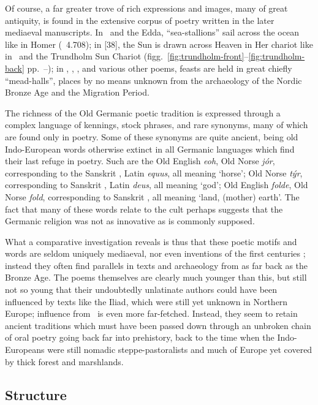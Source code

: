   Of course, a far greater trove of rich expressions and images, many of great antiquity, is found in the extensive corpus of poetry written in the later mediaeval manuscripts.  In \Beowulf\ and the Edda, “sea-stallions” sail across the ocean like in Homer (\Odyssey\ 4.708);
  in [38], the Sun is drawn across Heaven in Her chariot like in \Rigveda\ and the Trundholm Sun Chariot (figg.~\ref{fig:trundholm-front}--\ref{fig:trundholm-back} pp.~\pageref{fig:trundholm-front}--\pageref{fig:trundholm-back});
  in \Beowulf, , , and various other poems, feasts are held in great chiefly “mead-halls”, places by no means unknown from the archaeology of the Nordic Bronze Age and the Migration Period.

  The richness of the Old Germanic poetic tradition is expressed through a complex language of kennings, stock phrases, and rare synonyms, many of which are found only in poetry.  Some of these synonyms are quite ancient, being old Indo-European words otherwise extinct in all Germanic languages which find their last refuge in poetry.
  Such are the Old English \emph{eoh}, Old Norse \emph{jór}, corresponding to the Sanskrit , Latin \emph{equus}, all meaning ‘horse’; Old Norse \emph{týr}, corresponding to Sanskrit , Latin \emph{deus}, all meaning ‘god’; Old English \emph{folde}, Old Norse \emph{fold}, corresponding to Sanskrit , all meaning ‘land, (mother) earth’.  The fact that many of these words relate to the cult perhaps suggests that the Germanic religion was not as innovative as is commonly supposed.

  What a comparative investigation reveals is thus that these poetic motifs and words are seldom uniquely mediaeval, nor even inventions of the first centuries \ce; instead they often find parallels in texts and archaeology from as far back as the Bronze Age.  The poems themselves are clearly much younger than this, but still not so young that their undoubtedly unlatinate authors could have been influenced by texts like the Iliad, which were still yet unknown in Northern Europe; influence from \Rigveda\ is even more far-fetched.  Instead, they seem to retain ancient traditions which must have been passed down through an unbroken chain of oral poetry going back far into prehistory, back to the time when the Indo-Europeans were still nomadic steppe-pastoralists and much of Europe yet covered by thick forest and marshlands.

  \subsection{Structure}

